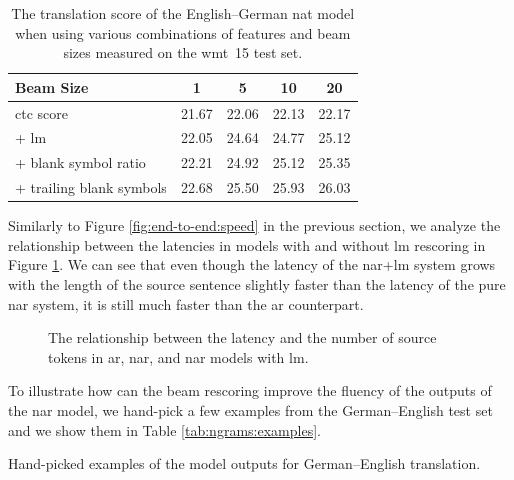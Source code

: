 \begin{table}
  \centering

  \begin{tabular}{lcccc}
    \toprule
    Beam Size &  1 &  5 &  10 &  20 \\
    \midrule
    \acs{ctc} score & 21.67 & 22.06 & 22.13 & 22.17 \\
    \quad + \acs{lm} & 22.05 & 24.64 & 24.77 & 25.12 \\
    \quad + blank symbol ratio & 22.21 & 24.92 & 25.12 & 25.35 \\
    \quad + trailing blank symbols  & 22.68 & 25.50 & 25.93 & 26.03 \\
    \bottomrule
  \end{tabular}

  \caption{The translation score of the English--German \ac{nat} model when
    using various combinations of features and beam sizes measured on the
    \acs{wmt}~15 test set.}%
  \label{tab:ngrams:features}
\end{table}

Similarly to Figure \ref{fig:end-to-end:speed} in the previous section, we
analyze the relationship between the latencies in models with and without
\ac{lm} rescoring in Figure \ref{fig:ngrams:speed}. We can see that even
though the latency of the \acs{nar}+\acs{lm} system grows with the length of
the source sentence slightly faster than the latency of the pure \acs{nar}
system, it is still much faster than the \ac{ar} counterpart.

\begin{figure}
  \centering
  

  \caption{The relationship between the latency and the number of source tokens
    in \acs{ar}, \acs{nar}, and \acs{nar} models with \acs{lm}.}%
  \label{fig:ngrams:speed}
\end{figure}

To illustrate how can the beam rescoring improve the fluency of the outputs of
the \ac{nar} model, we hand-pick a few examples from the German--English test
set and we show them in Table \ref{tab:ngrams:examples}.

\begin{table}
  \centering
  

  \caption{Hand-picked examples of the model outputs for German--English
    translation.}%
  \label{tab:ngrams:examples}
\end{table}


